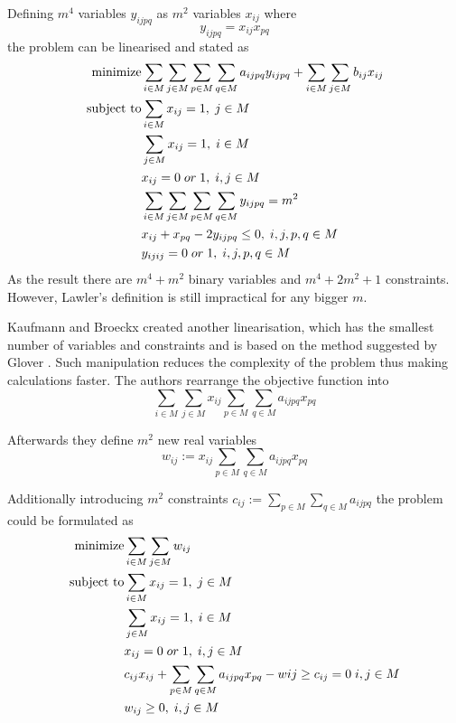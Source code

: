 \documentclass[english,a4paper,twoside]{ppfcmthesis}
\begin{document}
Defining $m^4$ variables $y_{ijpq}$ as $m^2$ variables $x_{ij}$ where
\begin{equation}
y_{ijpq} = x_{ij}x_{pq}
\end{equation}
the problem can be linearised and stated as
\begin{align}
  \text{minimize} &\null \sum_{i \in M} \sum_{j \in M} \sum_{p \in M} \sum_{q \in M} a_{ijpq}y_{ijpq} + \sum_{i \in M} \sum_{j \in M} b_{ij} x_{ij} \\
  \text{subject to} &\null \sum_{i \in M} x_{ij} = 1, \; j \in M \\
  &\null \sum_{j \in M} x_{ij} = 1, \; i \in M \\
  &\null x_{ij} = 0 \; or \; 1, \; i, j \in M \\
  &\null \sum_{i \in M} \sum_{j \in M} \sum_{p \in M} \sum_{q \in M} y_{ijpq} = m^2 \; \\
  &\null x_{ij} + x_{pq} - 2y_{ijpq} \leq 0, \; i, j, p, q \in M \\
  &\null y_{ijij} = 0 \; or \; 1, \; i, j, p, q \in M \\
\end{align}
As the result there are $m^4 + m^2$ binary variables and $m^4 + 2 m^2 + 1$ constraints. However, Lawler's definition is still impractical for any bigger $m$.

Kaufmann and Broeckx \cite{kaufman1978algorithm} created another linearisation, which has the smallest number of variables and constraints and is based on the method suggested by Glover \cite{gueye2009linearization}.
Such manipulation reduces the complexity of the problem thus making calculations faster.
The authors rearrange the objective function into
\begin{equation}
  \sum_{i \in M} \sum_{j \in M} x_{ij} \sum_{p \in M} \sum_{q \in M} a_{ijpq} x_{pq}
\end{equation}

Afterwards they define $m^2$ new real variables
\begin{equation}
  w_{ij} := x_{ij}\sum_{p \in M} \sum_{q \in M} a_{ijpq} x_{pq}
\end{equation}

Additionally introducing $m^2$ constraints $ c_{ij} := \sum_{p \in M} \sum_{q \in M} a_{ijpq} $ the problem could be formulated as
\begin{align}
  \text{minimize} &\null \sum_{i \in M} \sum_{j \in M} w_{ij}\\
  \text{subject to} &\null \sum_{i \in M} x_{ij} = 1, \; j \in M \\
  &\null \sum_{j \in M} x_{ij} = 1, \; i \in M \\
  &\null x_{ij} = 0 \; or \; 1, \; i, j \in M \\
  &\null c_{ij}x_{ij} + \sum_{p \in M} \sum_{q \in M} a_{ijpq}x_{pq} - w{ij} \geq c_{ij} = 0 \; i, j \in M \\
  &\null w_{ij} \geq 0, \; i, j \in M \\
\end{align}
\end{document}
